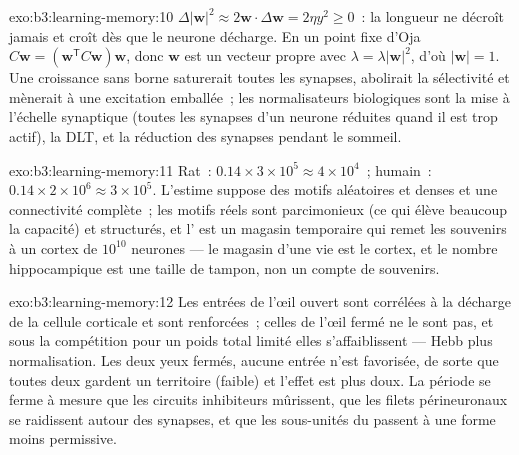 \begin{solution}{exo:b3:learning-memory:10}
$\Delta|\mathbf{w}|^{2} \approx 2\mathbf{w}\cdot\Delta\mathbf{w} = 2\eta
y^{2} \ge 0$~: la longueur ne décroît jamais et croît dès que le neurone
décharge. En un point fixe d'Oja $C\mathbf{w} = (\mathbf{w}^{\mathsf{T}}C
\mathbf{w})\mathbf{w}$, donc $\mathbf{w}$ est un vecteur propre avec $\lambda =
\lambda|\mathbf{w}|^{2}$, d'où $|\mathbf{w}| = 1$. Une croissance sans
borne saturerait toutes les synapses, abolirait la sélectivité et
mènerait à une excitation emballée~; les normalisateurs biologiques sont
la mise à l'échelle synaptique (toutes les synapses d'un neurone
réduites quand il est trop actif), la DLT, et la réduction des synapses
pendant le sommeil.
\end{solution}

\begin{solution}{exo:b3:learning-memory:11}
Rat~: $0.14\times 3\times 10^{5} \approx 4\times 10^{4}$~; humain~: $0.14
\times 2\times 10^{6} \approx 3\times 10^{5}$. L'estime suppose des
motifs aléatoires et denses et une connectivité complète~; les motifs
réels sont parcimonieux (ce qui élève beaucoup la capacité) et
structurés, et l' est un magasin temporaire qui remet les
souvenirs à un cortex de $10^{10}$ neurones --- le magasin d'une vie est
le cortex, et le nombre hippocampique est une taille de tampon, non un
compte de souvenirs.
\end{solution}

\begin{solution}{exo:b3:learning-memory:12}
Les entrées de l'œil ouvert sont corrélées à la décharge de la cellule
corticale et sont renforcées~; celles de l'œil fermé ne le sont pas, et
sous la compétition pour un poids total limité elles s'affaiblissent ---
Hebb plus normalisation. Les deux yeux fermés, aucune entrée n'est
favorisée, de sorte que toutes deux gardent un territoire (faible) et
l'effet est plus doux. La période se ferme à mesure que les circuits
inhibiteurs mûrissent, que les filets périneuronaux se raidissent autour
des synapses, et que les sous-unités du  passent à une
forme moins permissive.
\end{solution}

